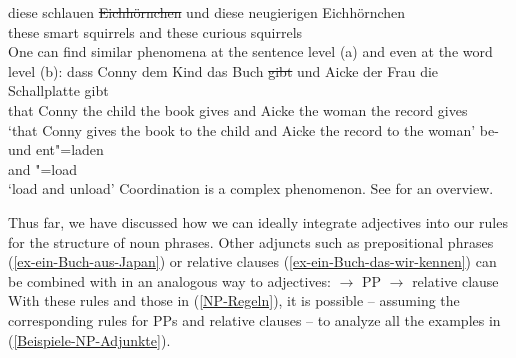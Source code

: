 \ea
\gll diese schlauen \st{Eichhörnchen} und diese neugierigen Eichhörnchen\\
     these smart    squirrels         and these curious     squirrels\\
\z
One can find similar phenomena at the sentence level (a) and even at the word level (b):
\eal
\ex 
\gll dass Conny dem Kind  das Buch \st{gibt} und Aicke der Frau die Schallplatte gibt\\
     that Conny the child the book gives     and Aicke the woman the record gives\\
\glt `that Conny gives the book to the child and Aicke the record to the woman'
\ex 
\gll be- und ent"=laden\\
     \prfx{} and \prfx{}"=load\\
\glt `load and unload'
\zl
Coordination is a complex phenomenon. See  for an overview.


Thus far, we have discussed how we can ideally integrate adjectives into our rules for the structure of noun phrases.
Other adjuncts such as prepositional phrases (\ref{ex-ein-Buch-aus-Japan}) or relative clauses (\ref{ex-ein-Buch-das-wir-kennen}) can be combined with \nbar in an analogous way to adjectives:
\eal
\ex\label{xbar-PP-Adjunkt-an-N} \nbar $\to$ \nbar PP
\ex \nbar $\to$ \nbar relative clause
\zl
With these rules and those in (\ref{NP-Regeln}), it is possible -- assuming the corresponding rules for PPs and
relative clauses -- to analyze all the examples in (\ref{Beispiele-NP-Adjunkte}).

